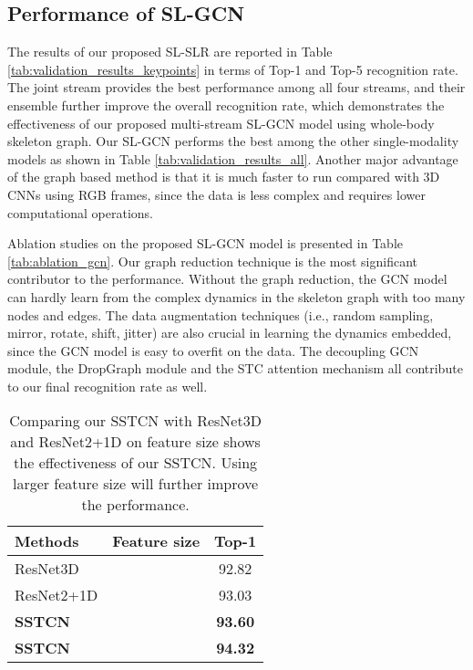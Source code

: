 \documentclass[final]{cvpr}
\begin{document}
\subsection{Performance of SL-GCN}
The results of our proposed SL-SLR are reported in Table \ref{tab:validation_results_keypoints} in terms of Top-1 and Top-5 recognition rate. The joint stream provides the best performance among all four streams, and their ensemble further improve the overall recognition rate, which demonstrates the effectiveness of our proposed multi-stream SL-GCN model using whole-body skeleton graph. Our SL-GCN performs the best among the other single-modality models as shown in Table \ref{tab:validation_results_all}. Another major advantage of the graph based method is that it is much faster to run compared with 3D CNNs using RGB frames, since the data is less complex and requires lower computational operations.

Ablation studies on the proposed SL-GCN model is presented in Table \ref{tab:ablation_gcn}. Our graph reduction technique is the most significant contributor to the performance. Without the graph reduction, the GCN model can hardly learn from the complex dynamics in the skeleton graph with too many nodes and edges. The data augmentation techniques (i.e., random sampling, mirror, rotate, shift, jitter) are also crucial in learning the dynamics embedded, since the GCN model is easy to overfit on the data. The decoupling GCN module, the DropGraph module and the STC attention mechanism all contribute to our final recognition rate as well. 
 
\begin{table}
\begin{center}
\begin{tabular}{l | c | c}
\hline
Methods & Feature size & Top-1 \\
\hline
\hline
ResNet3D       &  & 92.82\\
ResNet2+1D     &  & 93.03\\
\textbf{SSTCN} &  & \textbf{93.60}\\
\hline
\textbf{SSTCN} & & \textbf{94.32}\\
\hline
\end{tabular}
\end{center}\caption{Comparing our SSTCN with ResNet3D and ResNet2+1D on  feature size shows the effectiveness of our SSTCN. Using larger feature size will further improve the performance.}
\label{table:comparison_SSTCN}
\end{table}
\end{document}
